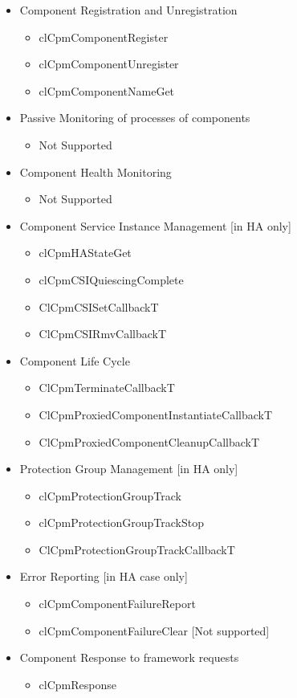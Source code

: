 \begin{itemize}
\item Component Registration and Unregistration\begin{itemize}
\item cl\-Cpm\-Component\-Register\item cl\-Cpm\-Component\-Unregister\item cl\-Cpm\-Component\-Name\-Get\end{itemize}
\item Passive Monitoring of processes of components\begin{itemize}
\item Not Supported\end{itemize}
\item Component Health Monitoring\begin{itemize}
\item Not Supported\end{itemize}
\item Component Service Instance Management \mbox{[}in HA only\mbox{]}\begin{itemize}
\item cl\-Cpm\-HAState\-Get\item cl\-Cpm\-CSIQuiescing\-Complete\item Cl\-Cpm\-CSISet\-Callback\-T\item Cl\-Cpm\-CSIRmv\-Callback\-T\end{itemize}
\item Component Life Cycle\begin{itemize}
\item Cl\-Cpm\-Terminate\-Callback\-T\item Cl\-Cpm\-Proxied\-Component\-Instantiate\-Callback\-T\item Cl\-Cpm\-Proxied\-Component\-Cleanup\-Callback\-T\end{itemize}
\item Protection Group Management \mbox{[}in HA only\mbox{]}\begin{itemize}
\item cl\-Cpm\-Protection\-Group\-Track\item cl\-Cpm\-Protection\-Group\-Track\-Stop\item Cl\-Cpm\-Protection\-Group\-Track\-Callback\-T\end{itemize}
\item Error Reporting \mbox{[}in HA case only\mbox{]}\begin{itemize}
\item cl\-Cpm\-Component\-Failure\-Report\item cl\-Cpm\-Component\-Failure\-Clear \mbox{[}Not supported\mbox{]}\end{itemize}
\item Component Response to framework requests\begin{itemize}
\item cl\-Cpm\-Response\end{itemize}
\end{itemize}


